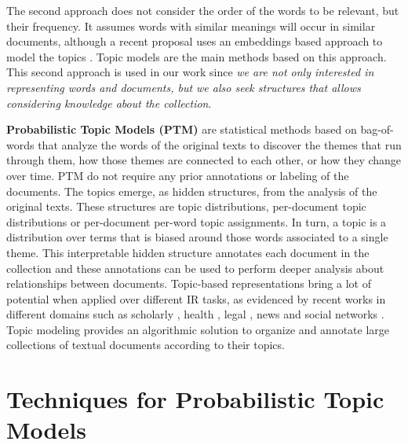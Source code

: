 The second approach does not consider the order of the words to be relevant, but their frequency. It assumes words with similar meanings will occur in similar documents, although a recent proposal uses an embeddings based approach to model the topics \citep{Dieng2020TopicMI}. Topic models \citep{Deerwester1990, Hofmann2001, Blei2003} are the main methods based on this approach. This second approach is used in our work since \textit{we are not only interested in representing words and documents, but we also seek structures that allows considering knowledge about the collection}.

\textbf{Probabilistic Topic Models (PTM)} \citep{Hofmann2001,Blei2003} are statistical methods based on bag-of-words that analyze the words of the original texts to discover the themes that run through them, how those themes are connected to each other, or how they change over time. PTM do not require any prior annotations or labeling of the documents. The topics emerge, as hidden structures, from the analysis of the original texts. These structures are topic distributions, per-document topic distributions or per-document per-word topic assignments. In turn, a topic is a distribution over terms that is biased around those words associated to a single theme. This interpretable hidden structure annotates each document in the collection and these annotations can be used to perform deeper analysis about relationships between documents. Topic-based representations bring a lot of potential when applied over different IR tasks, as evidenced by recent works in different domains such as scholarly  \citep{Gatti2015}, health \citep{Lu2016, TapiNzali2017}, legal \citep{ONeill2017, Greene2016}, news \citep{He2017} and social networks \citep{Cheng2014a}. Topic modeling provides an algorithmic solution to organize and annotate large collections of textual documents according to their topics.


\section{Techniques for Probabilistic Topic Models}\label{sec:techniques-prob-topics}

